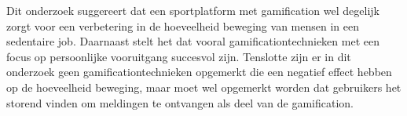 Dit onderzoek suggereert dat een sportplatform met gamification wel degelijk zorgt voor een verbetering in de hoeveelheid beweging van mensen in een sedentaire job. Daarnaast stelt het dat vooral gamificationtechnieken met een focus op persoonlijke vooruitgang succesvol zijn. Tenslotte zijn er in dit onderzoek geen gamificationtechnieken opgemerkt die een negatief effect hebben op de hoeveelheid beweging, maar moet wel opgemerkt worden dat gebruikers het storend vinden om meldingen te ontvangen als deel van de gamification.